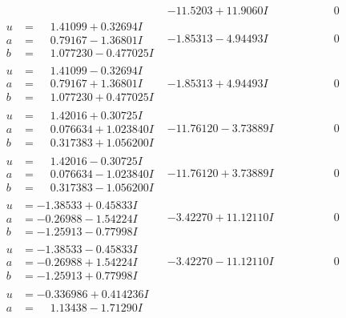 \documentclass[1p]{elsarticle_modified}
\theoremstyle{definition}
\begin{document}
$$\begin{array}{c|c|c}
 & -11.5203 + 11.9060 I & \phantom{-0.000000 } 0 \\ \hline\begin{aligned}
u &= \phantom{-}1.41099 + 0.32694 I \\
a &= \phantom{-}0.79167 - 1.36801 I \\
b &= \phantom{-}1.077230 - 0.477025 I\end{aligned}
 & -1.85313 - 4.94493 I & \phantom{-0.000000 } 0 \\ \hline\begin{aligned}
u &= \phantom{-}1.41099 - 0.32694 I \\
a &= \phantom{-}0.79167 + 1.36801 I \\
b &= \phantom{-}1.077230 + 0.477025 I\end{aligned}
 & -1.85313 + 4.94493 I & \phantom{-0.000000 } 0 \\ \hline\begin{aligned}
u &= \phantom{-}1.42016 + 0.30725 I \\
a &= \phantom{-}0.076634 + 1.023840 I \\
b &= \phantom{-}0.317383 + 1.056200 I\end{aligned}
 & -11.76120 - 3.73889 I & \phantom{-0.000000 } 0 \\ \hline\begin{aligned}
u &= \phantom{-}1.42016 - 0.30725 I \\
a &= \phantom{-}0.076634 - 1.023840 I \\
b &= \phantom{-}0.317383 - 1.056200 I\end{aligned}
 & -11.76120 + 3.73889 I & \phantom{-0.000000 } 0 \\ \hline\begin{aligned}
u &= -1.38533 + 0.45833 I \\
a &= -0.26988 - 1.54224 I \\
b &= -1.25913 - 0.77998 I\end{aligned}
 & -3.42270 + 11.12110 I & \phantom{-0.000000 } 0 \\ \hline\begin{aligned}
u &= -1.38533 - 0.45833 I \\
a &= -0.26988 + 1.54224 I \\
b &= -1.25913 + 0.77998 I\end{aligned}
 & -3.42270 - 11.12110 I & \phantom{-0.000000 } 0 \\ \hline\begin{aligned}
u &= -0.336986 + 0.414236 I \\
a &= \phantom{-}1.13438 - 1.71290 I \\

\end{aligned}
\end{array}$$
\end{document}
